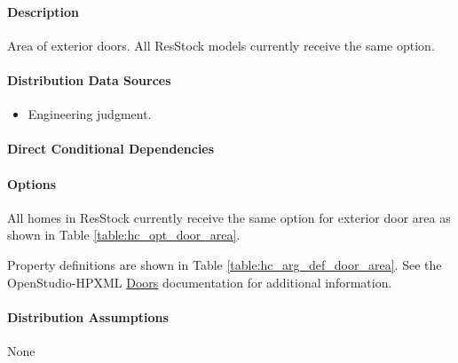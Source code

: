 \paragraph{Description}
% 
Area of exterior doors. All ResStock models currently receive the same option.

\paragraph{Distribution Data Sources}
% 
\begin{itemize}

\item
  Engineering judgment.
\end{itemize}

\paragraph{Direct Conditional Dependencies}


\paragraph{Options}
All homes in ResStock currently receive the same option for exterior door area as shown in Table \ref{table:hc_opt_door_area}.



Property definitions are shown in Table \ref{table:hc_arg_def_door_area}. See the OpenStudio-HPXML \href{https://openstudio-hpxml.readthedocs.io/en/v1.10.0/workflow_inputs.html#hpxml-doors}{Doors} documentation for additional information.



\paragraph{Distribution Assumptions}
% 
None

